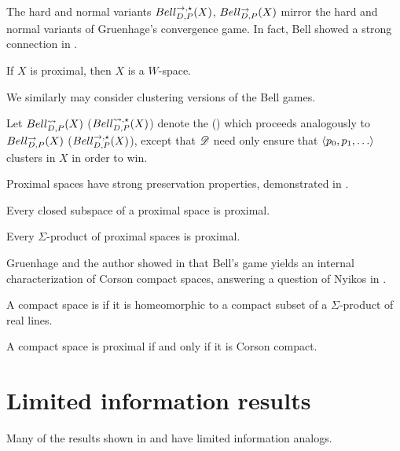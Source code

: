 The hard and normal variants $Bell_{D,P}^{\to,\star}(X)$, $Bell_{D,P}^{\to}(X)$ mirror the
hard and normal variants of Gruenhage's convergence game. In fact, Bell
showed a strong connection in \cite{MR3239205}.

\begin{thm}
  If $X$ is proximal, then $X$ is a $W$-space.
\end{thm}

We similarly may consider clustering versions of the Bell games.

\begin{defn}
  Let $Bell_{D,P}^{\leadsto}(X)$ ($Bell_{D,P}^{\leadsto,\star}(X)$) denote the
   () which
  proceeds analogously to $Bell_{D,P}^{\to}(X)$ ($Bell_{D,P}^{\to,\star}(X)$), except
  that $\mathscr{D}$ need only ensure that $\<p_0,p_1,\dots\>$ clusters
  in $X$ in order to win.
\end{defn}

Proximal spaces have strong preservation properties, demonstrated in
\cite{MR3239205}.

\begin{thm}
  Every closed subspace of a proximal space is proximal.
\end{thm}

\begin{thm}
  Every $\Sigma$-product of proximal spaces is proximal.
\end{thm}

Gruenhage and the author showed in \cite{MR3227201} that Bell's game
yields an internal characterization of Corson compact spaces, answering
a question of Nyikos in \cite{nyikosProximalPreprint}.

\begin{defn}
  A compact space is  if it is homeomorphic to a compact
  subset of a $\Sigma$-product of real lines.
\end{defn}

\begin{thm}
  A compact space is proximal if and only if it is Corson compact.
\end{thm}

\section{Limited information results}

Many of the results shown in \cite{MR3239205} and \cite{nyikosProximalPreprint}
have limited information analogs.

